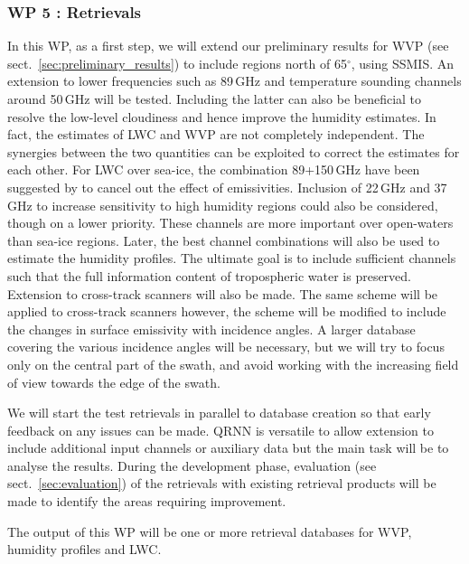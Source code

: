 \documentclass[12pt,oneside,a4paper]{article}
\begin{document}
\subsubsection*{WP 5 : Retrievals}
%
\label{sec:retrievals}
%
In this WP, as a first step, we will extend our preliminary results for WVP (see sect.~\ref{sec:preliminary_results}) to include regions north of 65$^\circ$, using SSMIS. An extension to lower frequencies such as  89\,GHz and temperature sounding channels around 50\,GHz will be tested. Including the latter can also be beneficial to resolve the low-level cloudiness and hence improve the humidity estimates. In fact, the estimates of LWC and WVP are not completely independent. The synergies between the two quantities can be exploited to correct the estimates for each other. For LWC over sea-ice, the combination 89+150\,GHz have been suggested by \citet{laue:2007:poten} to cancel out the effect of emissivities. Inclusion of 22\,GHz and 37\,GHz to increase sensitivity to high humidity regions could also be considered, though on a lower priority. These channels are more important over open-waters than sea-ice regions. Later, the best channel combinations will also be used to estimate the humidity profiles. The ultimate goal is to include sufficient channels such that the full information content of tropospheric water is preserved. Extension to cross-track scanners will also be made. The same scheme will be applied to cross-track scanners however, the scheme will be modified to include the changes in surface emissivity with incidence angles. A larger database covering the various incidence angles will be necessary, but we will try to focus only on the central part of the swath, and avoid working with the increasing field of view towards the edge of the swath. 

We will start the test retrievals in parallel to database creation so that early feedback on any issues can be made. QRNN is versatile to allow extension to include additional input channels or auxiliary data but the main task will be to analyse the results. During the development phase, evaluation (see sect.~\ref{sec:evaluation}) of the retrievals with existing retrieval products will be made to identify the areas requiring improvement.

The output of this WP will be one or more retrieval databases for WVP, humidity profiles and LWC.
\end{document}
